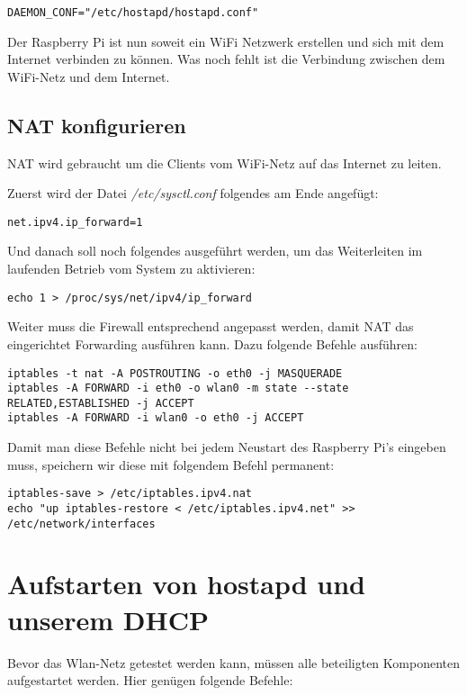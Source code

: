 \begin{lstlisting}
DAEMON_CONF="/etc/hostapd/hostapd.conf"
\end{lstlisting}

Der Raspberry Pi ist nun soweit ein WiFi Netzwerk erstellen und sich mit dem Internet verbinden zu können. Was noch fehlt ist die Verbindung zwischen dem WiFi-Netz und dem Internet.

\subsection{NAT konfigurieren}
NAT wird gebraucht um die Clients vom WiFi-Netz auf das Internet zu leiten.

Zuerst wird der Datei \textit{/etc/sysctl.conf} folgendes am Ende angefügt:

\begin{lstlisting}
net.ipv4.ip_forward=1
\end{lstlisting}

Und danach soll noch folgendes ausgeführt werden, um das Weiterleiten im laufenden Betrieb vom System zu aktivieren:

\begin{lstlisting}
echo 1 > /proc/sys/net/ipv4/ip_forward
\end{lstlisting}

Weiter muss die Firewall entsprechend angepasst werden, damit NAT das eingerichtet Forwarding ausführen kann.
Dazu folgende Befehle ausführen:

\begin{lstlisting}
iptables -t nat -A POSTROUTING -o eth0 -j MASQUERADE
iptables -A FORWARD -i eth0 -o wlan0 -m state --state RELATED,ESTABLISHED -j ACCEPT
iptables -A FORWARD -i wlan0 -o eth0 -j ACCEPT
\end{lstlisting}

Damit man diese Befehle nicht bei jedem Neustart des Raspberry Pi's eingeben muss, speichern wir diese mit folgendem Befehl permanent:

\begin{lstlisting}
iptables-save > /etc/iptables.ipv4.nat
echo "up iptables-restore < /etc/iptables.ipv4.net" >> /etc/network/interfaces
\end{lstlisting}

\section{Aufstarten von hostapd und unserem DHCP}
Bevor das Wlan-Netz getestet werden kann, müssen alle beteiligten Komponenten aufgestartet werden.
Hier genügen folgende Befehle:

